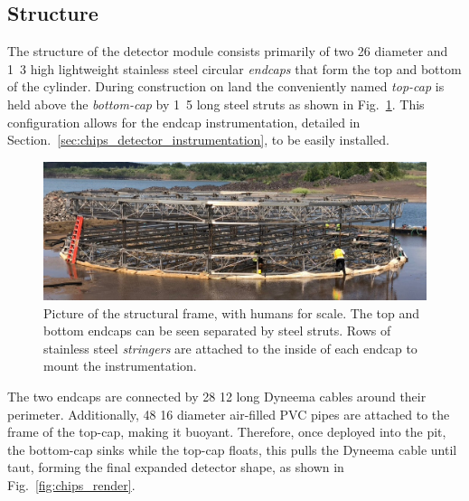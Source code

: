 \subsection{Structure} %
\label{sec:chips_detector_structure} %

The structure of the \chipsfive detector module consists primarily of two \unit{26}{}
diameter and \unit{1.3}{} high lightweight stainless steel circular \emph{endcaps} that
form the top and bottom of the cylinder. During construction on land the conveniently named
\emph{top-cap} is held above the \emph{bottom-cap} by \unit{1.5}{} long steel struts as
shown in Fig.~\ref{fig:frame}. This configuration allows for the endcap instrumentation, detailed
in Section.~\ref{sec:chips_detector_instrumentation}, to be easily installed.

\begin{figure} %
    \includegraphics[width=\textwidth]{diagrams/4-chips/frame.jpeg}
    \caption[Picture of the \chipsfive structural frame.]
    {Picture of the \chipsfive structural frame, with humans for scale. The top and bottom endcaps
        can be seen separated by steel struts. Rows of stainless steel \emph{stringers}
        are attached to the inside of each endcap to mount the instrumentation.}
    \label{fig:frame}
\end{figure}

The two endcaps are connected by 28 \unit{12}{} long Dyneema cables around their
perimeter. Additionally, 48 \unit{16}{} diameter air-filled PVC pipes are attached to
the frame of the top-cap, making it buoyant. Therefore, once deployed into the pit, the bottom-cap
sinks while the top-cap floats, this pulls the Dyneema cable until taut, forming the final
expanded detector shape, as shown in Fig.~\ref{fig:chips_render}.

